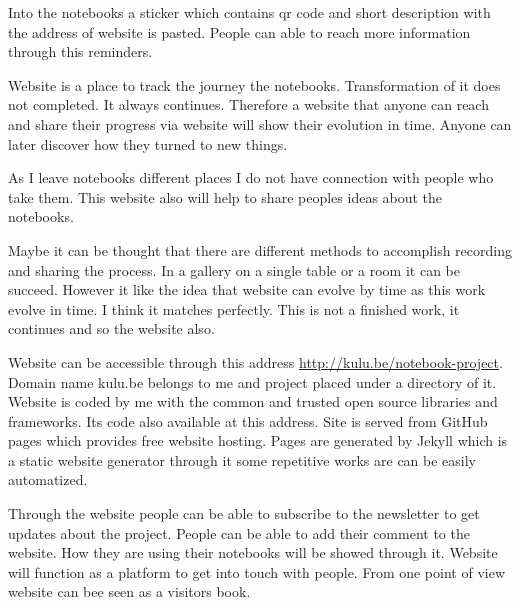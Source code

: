 Into the notebooks a sticker which contains qr code and short description with the address of website is pasted. People can able to reach more information through this reminders. 


Website is a place to track the journey the notebooks. Transformation of it does not completed. It always continues. Therefore a website that anyone can reach and share their progress via website will show their evolution in time. Anyone can later discover how they turned to new things.

As I leave notebooks different places I do not have connection with people who take them. This website also will help to share peoples ideas about the notebooks.

Maybe it can be thought that there are different methods to accomplish recording and sharing the process. In a gallery on a single table or a room it can be succeed. However it like the idea that website can evolve by time as this work evolve in time. I think it matches perfectly. This is not a finished work, it continues and so the website also.


Website can be accessible through this address \url{http://kulu.be/notebook-project}. Domain name kulu.be belongs to me and project placed under a directory of it. Website is coded by me with the common and trusted open source libraries and frameworks. Its code also available at this address. Site is served from GitHub pages which provides free website hosting. Pages are generated by Jekyll which is a static website generator through it some repetitive works are can be easily automatized. 

Through the website people can be able to subscribe to the newsletter to get updates about the project. People can be able to add their comment to the website. How they are using their notebooks will be showed through it. Website will function as a platform to get into touch with people. From one point of view website can bee seen as a visitors book.

